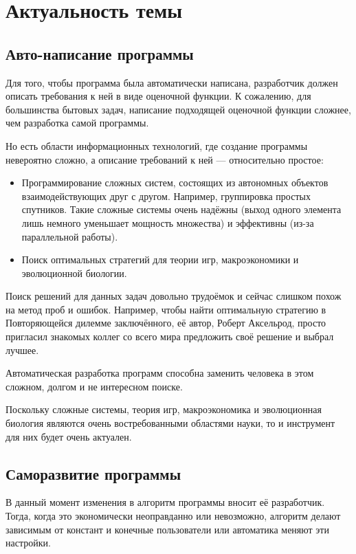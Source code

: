 \documentclass[utf8,a5paper,portrait,12pt]{eskdtext}
\begin{document}
\tableofcontents

\newpage
\section{Актуальность темы}

\subsection{Авто-написание программы}

Для того, чтобы программа была автоматически написана, разработчик должен
описать требования к ней в виде оценочной функции. К сожалению, для большинства
бытовых задач, написание подходящей оценочной функции сложнее, чем
разработка самой программы.

Но есть области информационных технологий, где создание программы невероятно
сложно, а описание требований к ней — относительно простое:
\begin{itemize}
  \item Программирование сложных систем, состоящих из автономных объектов
        взаимодействующих друг с другом. Например, группировка простых
        спутников. Такие сложные системы очень надёжны (выход одного элемента
        лишь немного уменьшает мощность множества) и эффективны (из-за
        параллельной работы).
  \item Поиск оптимальных стратегий для теории игр, макроэкономики и
        эволюционной биологии.\cite{communication}
\end{itemize}

Поиск решений для данных задач довольно трудоёмок и сейчас слишком похож на
метод проб и ошибок. Например, чтобы найти оптимальную стратегию в Повторяющейся
дилемме заключённого, её автор, Роберт Аксельрод, просто пригласил знакомых
коллег со всего мира предложить своё решение и выбрал лучшее.\cite{dilemma}

Автоматическая разработка программ способна заменить человека в этом сложном,
долгом и не интересном поиске.

Поскольку сложные системы, теория игр, макроэкономика и эволюционная биология
являются очень востребованными областями науки, то и инструмент для них будет
очень актуален.

\subsection{Саморазвитие программы}

В данный момент изменения в алгоритм программы вносит её разработчик. Тогда,
когда это экономически неоправданно или невозможно, алгоритм делают зависимым
от констант и конечные пользователи или автоматика меняют эти настройки.
\end{document}
